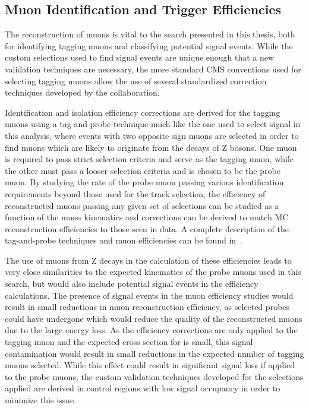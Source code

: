\subsection{Muon Identification and Trigger Efficiencies}
The reconstruction of muons is vital to the search presented in this thesis, both for identifying tagging muons and classifying potential signal events.
While the custom selections used to find signal events are unique enough that a new validation techniques are necessary, the more standard CMS conventions used for selecting tagging muons allow the use of several standardized correction techniques developed by the collaboration.

Identification and isolation efficiency corrections are derived for the tagging muons using a tag-and-probe technique much like the one used to select signal in this analysis, where events with two opposite sign muons are selected in order to find muons which are likely to originate from the decays of Z bosons.
One muon is required to pass strict selection criteria and serve as the tagging muon, while the other must pass a looser selection criteria and is chosen to be the probe muon.
By studying the rate of the probe muon passing various identification requirements beyond those used for the track selection, the efficiency of reconstructed muons passing any given set of selections can be studied as a function of the muon kinematics and corrections can be derived to match MC reconstruction efficiencies to those seen in data. 
A complete description of the tag-and-probe techniques and muon efficiencies can be found in~\cite{cmsMuonPerformance}.

The use of muons from Z decays in the calculation of these efficiencies leads to very close similarities to the expected kinematics of the probe muons used in this search, but would also include potential signal events in the efficiency calculations. 
The presence of signal events in the muon efficiency studies would result in small reductions in muon reconstruction efficiency, as selected probes could have undergone \dbrem which would reduce the quality of the reconstructed muons due to the large energy loss. 
As the efficiency corrections are only applied to the tagging muon and the expected cross section for \dbrem is small, this signal contamination would result in small reductions in the expected number of tagging muons selected.
While this effect could result in significant signal loss if applied to the probe muons, the custom validation techniques developed for the selections applied are derived in control regions with low signal occupancy in order to minimize this issue.

